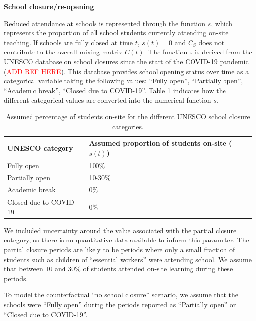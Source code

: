 \vspace{5pt}
\textbf{School closure/re-opening}

Reduced attendance at schools is represented through the function $s$, which represents the proportion of all school students 
currently attending on-site teaching. If schools are fully closed at time $t$, \(s(t)=0\) and \(C_{S}\) does not contribute to the overall 
mixing matrix \(C(t)\). 
The function $s$ is derived from the UNESCO database on school closures since the start of the COVID-19 pandemic (\textcolor{red}{ADD REF HERE}).
This database provides school opening status over time as a categorical variable taking the following values: ``Fully open'', ``Partially open'', ``Academic break'', ``Closed due to COVID-19''.
Table \ref{tab:unesco_categories} indicates how the different categorical values are converted into the numerical function $s$.

\begin{table}[ht]  
  \begin{center}
      \begin{tabular}{p{5cm} | p{5cm}}
          \hline
          \textbf{UNESCO category} & \textbf{Assumed proportion of students on-site ($s(t)$)} \\
          \hline
          Fully open & 100\% \\
          Partially open & 10-30\% \\
          Academic break & 0\% \\
          Closed due to COVID-19 & 0\% \\
          \hline
      \end{tabular}
    \end{center}
      \caption{Assumed percentage of students on-site for the different UNESCO school closure categories.}
      \label{tab:unesco_categories}
  \end{table}

We included uncertainty around the value associated with the partial closure category, as there is no quantitative data available to 
inform this parameter. The partial closure periods are likely to be periods where only a small fraction of students such as children of ``essential workers'' were 
attending school. We assume that between 10 and 30\% of students attended on-site learning during these periods.

To model the counterfactual ``no school closure'' scenario, we assume that the schools were ``Fully open'' during the
periods reported as ``Partially open'' or ``Closed due to COVID-19''.

